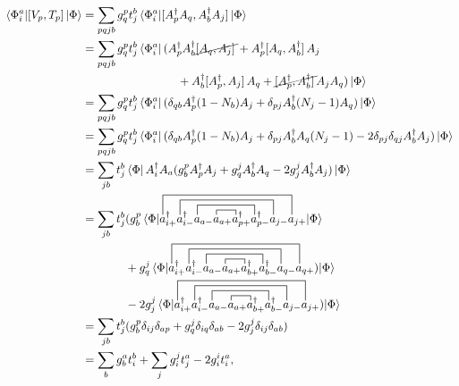 \documentclass[10pt]{article}
\begin{document}
\begin{align}
\mel*{\Phi^a_i}{\comm*{V_p}{T_p}}{\Phi}
&=
\sum_{pqjb}g^p_qt^b_j\mel*{\Phi^a_i}{\comm*{A^\dagger_pA_q}{A^\dagger_bA_j}}{\Phi}
\nonumber
\\
&=
\sum_{pqjb}g^p_qt^b_j\bra*{\Phi^a_i}(A^\dagger_pA^\dagger_b\cancel{\comm*{A_q}{A_j}}+A^\dagger_p\comm*{A_q}{A^\dagger_b}A_j
\nonumber
\\
&\hspace{28.75mm}+
A^\dagger_b\comm*{A^\dagger_p}{A_j}A_q+\cancel{\comm*{A^\dagger_p}{A^\dagger_b}}A_jA_q)\ket{\Phi}
\nonumber
\\
&=
\sum_{pqjb}g^p_qt^b_j\bra*{\Phi^a_i}(\delta_{qb}A^\dagger_p(1-N_b)A_j+\delta_{pj}A^\dagger_b(N_j-1)A_q)\ket{\Phi}
\nonumber
\\
&=
\sum_{pqjb}g^p_qt^b_j\bra*{\Phi^a_i}(\delta_{qb}A^\dagger_p(1-N_b)A_j+\delta_{pj}A^\dagger_bA_q(N_j-1)-2\delta_{pj}\delta_{qj}A^\dagger_bA_j)\ket{\Phi}
\nonumber
\\
&=
\sum_{jb}t^b_j\bra*{\Phi}A^\dagger_iA_a(g^p_bA^\dagger_pA_j+g^j_qA^\dagger_bA_q-2g^j_jA^\dagger_bA_j)\ket{\Phi}
\nonumber
\\
&=
\sum_{jb}t^b_j(g^p_b
\mel*{\Phi}{
\contraction[1ex]{a^\dagger_{i+}a^\dagger_{i-}a_{a-}}{a}{_{a+}}
{a}
\contraction[2ex]{a^\dagger_{i+}a^\dagger_{i-}}{a}{_{a-}a_{a+}
a^\dagger_{p+}}{a}
\contraction[3ex]{a^\dagger_{i+}}{a}{^\dagger_{i-}a_{a-}a_{a+}
a^\dagger_{p+}a^\dagger_{p-}}{a}
\contraction[4ex]{}{a}{^\dagger_{i+}a^\dagger_{i-}a_{a-}a_{a+}
a^\dagger_{p+}a^\dagger_{p-}a_{j-}}{a}
a^\dagger_{i+}a^\dagger_{i-}a_{a-}a_{a+}a^\dagger_{p+}a^\dagger_{p-}a_{j-}a_{j+}
}{\Phi}
\nonumber
\\
&\hspace{13mm}+
g^j_q
\mel*{\Phi}{
\contraction[1ex]{a^\dagger_{i+}a^\dagger_{i-}a_{a-}}{a}{_{a+}}
{a}
\contraction[2ex]{a^\dagger_{i+}a^\dagger_{i-}}{a}{_{a-}a_{a+}
a^\dagger_{b+}}{a}
\contraction[3ex]{a^\dagger_{i+}}{a}{^\dagger_{i-}a_{a-}a_{a+}
a^\dagger_{b+}a^\dagger_{b-}}{a}
\contraction[4ex]{}{a}{^\dagger_{i+}a^\dagger_{i-}a_{a-}a_{a+}
a^\dagger_{b+}a^\dagger_{b-}a_{q-}}{a}
a^\dagger_{i+}a^\dagger_{i-}a_{a-}a_{a+}a^\dagger_{b+}a^\dagger_{b-}a_{q-}a_{q+}
)}{\Phi}
\nonumber
\\
&\hspace{13mm}-2
g^j_j
\mel*{\Phi}{
\contraction[1ex]{a^\dagger_{i+}a^\dagger_{i-}a_{a-}}{a}{_{a+}}
{a}
\contraction[2ex]{a^\dagger_{i+}a^\dagger_{i-}}{a}{_{a-}a_{a+}
a^\dagger_{b+}}{a}
\contraction[3ex]{a^\dagger_{i+}}{a}{^\dagger_{i-}a_{a-}a_{a+}
a^\dagger_{b+}a^\dagger_{b-}}{a}
\contraction[4ex]{}{a}{^\dagger_{i+}a^\dagger_{i-}a_{a-}a_{a+}
a^\dagger_{b+}a^\dagger_{b-}a_{q-}}{a}
a^\dagger_{i+}a^\dagger_{i-}a_{a-}a_{a+}a^\dagger_{b+}a^\dagger_{b-}a_{j-}a_{j+}
)}{\Phi}
\nonumber
\\
&=
\sum_{jb}t^b_j(g^p_b\delta_{ij}\delta_{ap}+g^j_q\delta_{iq}\delta_{ab}-2g^j_j\delta_{ij}\delta_{ab})
\nonumber
\\
&=
\sum_bg^a_bt^b_i+\sum_jg^j_it^a_j-2g^i_it^a_i
,\end{align}
\end{document}
